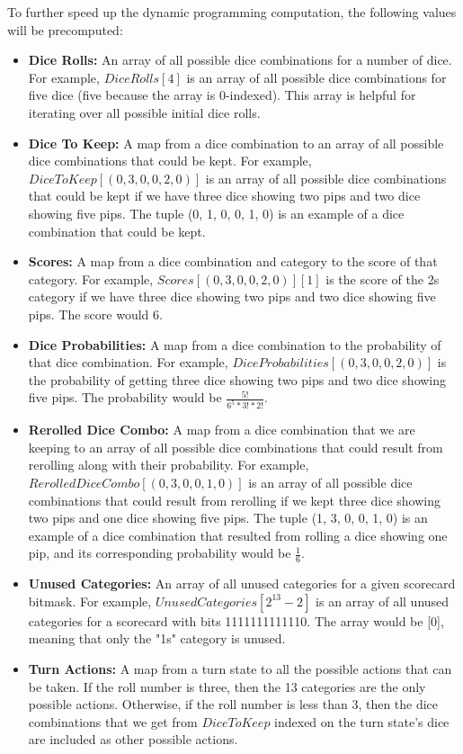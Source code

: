\documentclass[12pt]{article}
\begin{document}
To further speed up the dynamic programming computation, the following values will be precomputed:

\begin{itemize}
    \item \textbf{Dice Rolls:} An array of all possible dice combinations for a number of dice. For example, $DiceRolls[4]$ is an array of all possible dice combinations for five dice (five because the array is 0-indexed). This array is helpful for iterating over all possible initial dice rolls.
    \item \textbf{Dice To Keep:} A map from a dice combination to an array of all possible dice combinations that could be kept. For example, $DiceToKeep[(0, 3, 0, 0, 2, 0)]$ is an array of all possible dice combinations that could be kept if we have three dice showing two pips and two dice showing five pips. The tuple (0, 1, 0, 0, 1, 0) is an example of a dice combination that could be kept.
    \item \textbf{Scores:} A map from a dice combination and category to the score of that category. For example, $Scores[(0, 3, 0, 0, 2, 0)][1]$ is the score of the 2s category if we have three dice showing two pips and two dice showing five pips. The score would 6.
    \item \textbf{Dice Probabilities:} A map from a dice combination to the probability of that dice combination. For example, $DiceProbabilities[(0, 3, 0, 0, 2, 0)]$ is the probability of getting three dice showing two pips and two dice showing five pips. The probability would be $\frac{5!}{6^{5} * 3! * 2!}$.
    \item \textbf{Rerolled Dice Combo:} A map from a dice combination that we are keeping to an array of all possible dice combinations that could result from rerolling along with their probability. For example, $RerolledDiceCombo[(0, 3, 0, 0, 1, 0)]$ is an array of all possible dice combinations that could result from rerolling if we kept three dice showing two pips and one dice showing five pips. The tuple (1, 3, 0, 0, 1, 0) is an example of a dice combination that resulted from rolling a dice showing one pip, and its corresponding probability would be $\frac{1}{6}$.
    \item \textbf{Unused Categories:} An array of all unused categories for a given scorecard bitmask. For example, $UnusedCategories[2^{13} - 2]$ is an array of all unused categories for a scorecard with bits 1111111111110. The array would be [0], meaning that only the "1s" category is unused.
    \item \textbf{Turn Actions:} A map from a turn state to all the possible actions that can be taken. If the roll number is three, then the 13 categories are the only possible actions. Otherwise, if the roll number is less than 3, then the dice combinations that we get from $DiceToKeep$ indexed on the turn state's dice are included as other possible actions.
\end{itemize}
\end{document}
